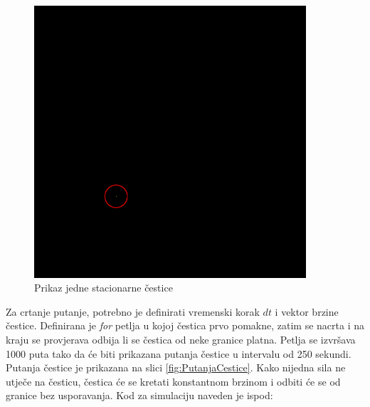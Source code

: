 \documentclass{foi}
\begin{document}
\begin{figure}[H]
    \centering
    \includegraphics[width=0.9\textwidth]{slike/9_CesticaNaPlatnu.png}
    \captionsetup{justification=centering}
    \caption{Prikaz jedne stacionarne čestice}
\label{fig:CesticaNaPlatnu}
\end{figure}

Za crtanje putanje, potrebno je definirati vremenski korak $dt$ i vektor brzine čestice. Definirana je \textit{for} petlja u kojoj čestica prvo pomakne, zatim se nacrta i na kraju se provjerava odbija li se čestica od neke granice platna. Petlja se izvršava 1000 puta tako da će biti prikazana putanja čestice u intervalu od 250 sekundi. Putanja čestice je prikazana na slici \ref{fig:PutanjaCestice}. Kako nijedna sila ne utječe na česticu, čestica će se kretati konstantnom brzinom i odbiti će se od granice bez usporavanja. Kod za simulaciju naveden je ispod:
\end{document}
